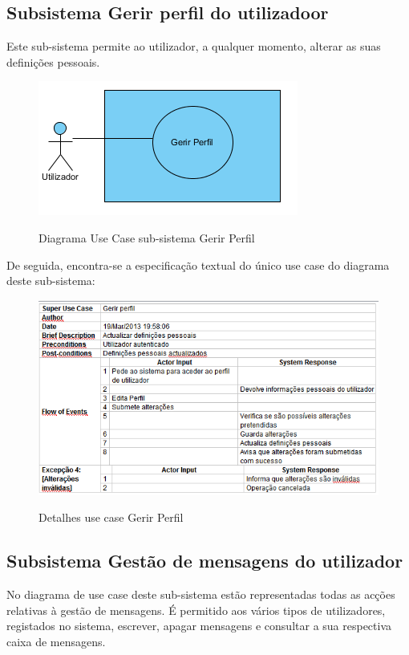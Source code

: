 ﻿\documentclass[12pt,a4paper]{article}
\begin{document}
\clearpage
\subsection{Subsistema Gerir perfil do utilizadoor}
Este sub-sistema permite ao utilizador, a qualquer momento, alterar as suas definições pessoais.\\

\begin{figure}[h!]
\centering
\includegraphics[scale=1]{usecase/U_GerirPerfil}
\label{usecase}
\caption{Diagrama Use Case sub-sistema Gerir Perfil}
\end{figure}

De seguida, encontra-se a especificação textual do único use case do diagrama deste sub-sistema:\\

\begin{figure}[h!]
\centering
\includegraphics[scale=0.7]{d_usecase/gerirperfil}
\label{usecase}
\caption{Detalhes use case Gerir Perfil}
\end{figure}

\newpage
\subsection{Subsistema Gestão de mensagens do utilizador}
No diagrama de use case deste sub-sistema estão representadas todas as acções relativas à gestão de mensagens. É permitido aos vários tipos de utilizadores, registados no sistema, escrever, apagar mensagens e consultar a sua respectiva caixa de mensagens.\\
\end{document}
